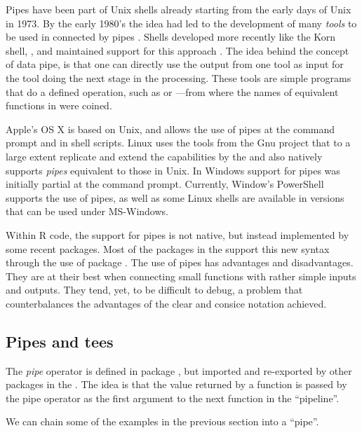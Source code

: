 \documentclass[krantz2]{krantz}\usepackage{knitr}%
\begin{document}
Pipes have been part of Unix shells already starting from the early days of Unix in 1973. By the early 1980's the idea had led to the development of many \emph{tools} to be used in  connected by pipes \autocite{Kernigham1981}. Shells developed more recently like the Korn shell, , and  maintained support for this approach \autocite{Rosenblatt1993}. The idea behind the concept of data pipe, is that one can directly use the output from one tool as input for the tool doing the next stage in the processing. These tools are simple programs that do a defined operation, such as  or ---from where the names of equivalent functions in  were coined.

Apple's OS X is based on Unix, and allows the use of pipes at the command prompt and in shell scripts. Linux uses the tools from the Gnu project that to a large extent replicate and extend the capabilities  by the and also natively supports \emph{pipes} equivalent to those in Unix. In Windows support for pipes was initially partial at the command prompt. Currently, Window's PowerShell supports the use of pipes, as well as some Linux shells are available in versions that can be used under MS-Windows.

Within R code, the support for pipes is not native, but instead implemented by some recent packages. Most of the packages in the  support this new syntax through the use of package . The use of pipes has advantages and disadvantages. They are at their best when connecting small functions with rather simple inputs and outputs. They tend, yet, to be difficult to debug, a problem that counterbalances the advantages of the clear and consice notation achieved.

\subsection{Pipes and tees}

The \emph{pipe} operator \Roperator{\%>\%} is defined in package , but imported and re-exported by other packages in the . The idea is that the value returned by a function is passed by the pipe operator as the first argument to the next function in the ``pipeline''.

We can chain some of the examples in the previous section into a ``pipe''.
\end{document}
